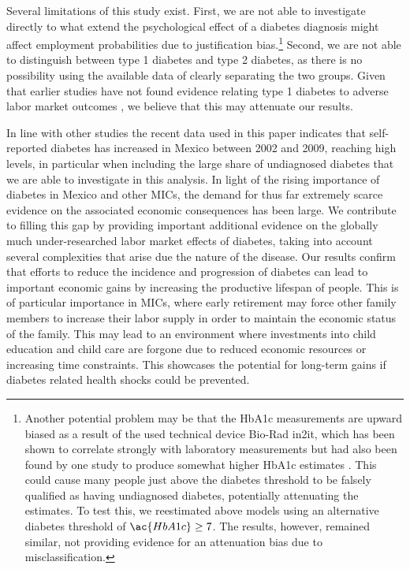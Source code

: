 \documentclass[12pt,english,british]{article}
\begin{document}
Several limitations of this study exist. First, we are not able to investigate directly to what extend the psychological effect of a diabetes diagnosis might affect employment probabilities due to justification bias.\footnote{Another potential problem may be that the \ac{HbA1c} measurements are upward biased as a result of the used technical device Bio-Rad in2it, which has been shown to correlate strongly with laboratory measurements \citep{HealthQualityOntario2014} but had also been found by one study to produce somewhat higher \ac{HbA1c} estimates \citep{Yeo2009}. This could cause many people just above the diabetes threshold to be falsely qualified as having undiagnosed diabetes, potentially attenuating the estimates. To test this, we reestimated above models using an alternative diabetes threshold of $\ac{HbA1c} \geq 7$. The results, however, remained similar, not providing evidence for an attenuation bias due to misclassification.} Second, we are not able to distinguish between type 1 diabetes and type 2 diabetes, as there is no possibility using the available data of clearly separating the two groups. Given that earlier studies have not found evidence relating type 1 diabetes to adverse labor market outcomes \citep{Minor2010,Minor2013}, we believe that this may attenuate our results.

In line with other studies the recent data used in this paper indicates that self-reported diabetes has increased in Mexico between 2002 and 2009, reaching high 
levels, in particular when including the large share of undiagnosed diabetes that we are able to investigate in this analysis. In light of the rising importance of diabetes in Mexico and other \ac{MICs}, the demand for  thus far extremely scarce evidence on the associated economic consequences has been large. We contribute to filling this gap by providing important additional evidence on the globally much under-researched labor market effects of diabetes, taking into account several complexities that arise due the nature of the disease. Our results confirm that efforts to reduce the incidence and progression of diabetes can lead to important economic gains by increasing the productive lifespan of people. This is of particular importance in \ac{MICs}, where early retirement may force other family members to increase their labor supply in order to maintain the economic status of the family. This may lead to an environment where investments into child education and child care are forgone due to reduced economic resources or increasing time constraints. This showcases the potential for long-term gains if diabetes related health shocks could be prevented. 
\end{document}
